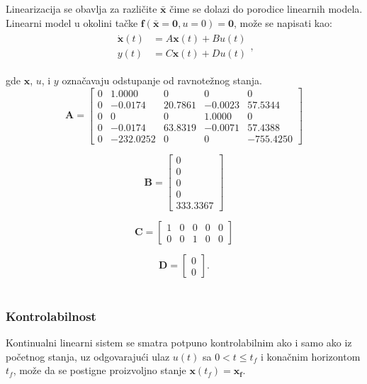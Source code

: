 \documentclass[a4paper,11pt]{article}
\theoremstyle{definition} \newtheorem{deff}{Definicija}[section]
\theoremstyle{definition} \newtheorem{prim}[deff]{Primer}
\theoremstyle{plain} \newtheorem{teor}[deff]{Teorema}
\newcommand{\vect}[1]{\boldsymbol{\mathbf{#1}}}
\begin{document}
	Linearizacija se obavlja za različite $\bar{\mathbf{x}}$ čime se dolazi do porodice linearnih modela. Linearni model u okolini tačke  $\vect{f}(\vect{\bar{x}} = \vect{0}, u = 0) = \vect{0}$, može se napisati kao:
	\begin{align}
		\begin{split}
			\vect{\dot{x}}(t) &= A\vect{x}(t) + Bu(t) \\
			y(t) &= C\vect{x}(t) + Du(t)
		\end{split},
		\label{eg:lin_mod}
	\end{align}
	
	
	gde  $\vect{x}$, $u$, i $y$ označavaju odstupanje od ravnotežnog stanja. 
	\[
	\mathbf{A} =
	\begin{bmatrix}
		0 & 1.0000 & 0 & 0 & 0 \\
		0 & -0.0174 & 20.7861 & -0.0023 & 57.5344 \\
		0 & 0 & 0 & 1.0000 & 0 \\
		0 & -0.0174 & 63.8319 & -0.0071 & 57.4388 \\
		0 & -232.0252 & 0 & 0 & -755.4250
	\end{bmatrix}
	\]
	
	\[
	\mathbf{B} =
	\begin{bmatrix}
		0 \\
		0 \\
		0 \\
		0 \\
		333.3367
	\end{bmatrix}
	\]
	
	\[
	\mathbf{C} =
	\begin{bmatrix}
		1 & 0 & 0 & 0 & 0 \\
		0 & 0 & 1 & 0 & 0
	\end{bmatrix}
	\]
	
	\[
	\mathbf{D} =
	\begin{bmatrix}
		0 \\
		0
	\end{bmatrix}.
	\] \\[16pt]
	
	
	\subsubsection{Kontrolabilnost} \label{sec:kontrolabilnost}
	
	Kontinualni linearni sistem se smatra potpuno kontrolabilnim ako i samo ako iz početnog stanja, uz odgovarajući ulaz $u(t)$ sa $0 < t \leq t_f$ i konačnim horizontom $t_f$, može da se postigne
	proizvoljno stanje $\vect{x}(t_f) = \vect{x_f}$. \\
	
\end{document}
